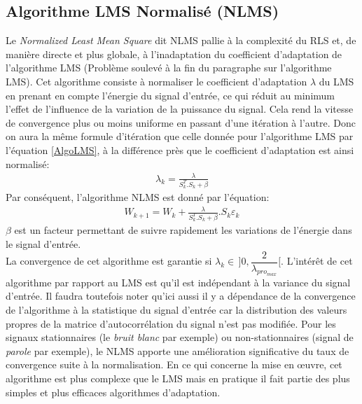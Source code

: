 \subsection{Algorithme LMS Normalisé (NLMS) \cite{ThAlaedine, Fmy}}
Le \emph{Normalized Least Mean Square} dit NLMS pallie à la complexité du RLS et, de manière directe et plus globale, à l'inadaptation du coefficient d'adaptation de l'algorithme LMS (Problème soulevé à la fin du paragraphe sur l'algorithme LMS). Cet algorithme consiste à normaliser le coefficient d'adaptation $ \lambda $ du LMS en prenant en compte l'énergie du signal d'entrée, ce qui réduit au minimum l'effet de l'influence de la variation de la puissance du signal. Cela rend la vitesse de convergence plus ou moins uniforme en passant d'une itération à l'autre. Donc on aura la même formule d'itération que celle donnée pour l'algorithme LMS par l'équation \ref{AlgoLMS}, à la différence près que le coefficient d'adaptation est ainsi normalisé:
\begin{eqnarray}
\lambda_{k} = \frac{\lambda}{S_{k}^{T}.S_{k} + \beta}
\end{eqnarray}
Par conséquent, l'algorithme NLMS est donné par l'équation:
\begin{eqnarray}\label{AlgoNLMS}
W_{k+1} = W_{k} + \frac{\lambda}{S_{k}^{T}.S_{k} + \beta}.S_{k}\varepsilon_{k}
\end{eqnarray}
$ \beta $ est un facteur permettant de suivre rapidement les variations de l'énergie dans le signal d'entrée.\\
La convergence de cet algorithme est garantie si $ \lambda_{k} \in\, \rbrack 0,\dfrac{2}{\lambda_{pro_{max}}} \lbrack $. L'intérêt de cet algorithme par rapport au LMS est qu'il est indépendant à la variance du signal d'entrée. Il faudra toutefois noter qu'ici aussi il y a dépendance de la convergence de l'algorithme à la statistique du signal d'entrée car la distribution des valeurs propres de la matrice d'autocorrélation du signal n'est pas modifiée. Pour les signaux stationnaires (le \emph{bruit blanc}  par exemple) ou non-stationnaires (signal de \emph{parole} par exemple), le NLMS apporte une amélioration significative du taux de convergence suite à la normalisation. En ce qui concerne la mise en œuvre, cet algorithme est plus complexe que le LMS mais en pratique il fait partie des plus simples et plus efficaces algorithmes d'adaptation.
